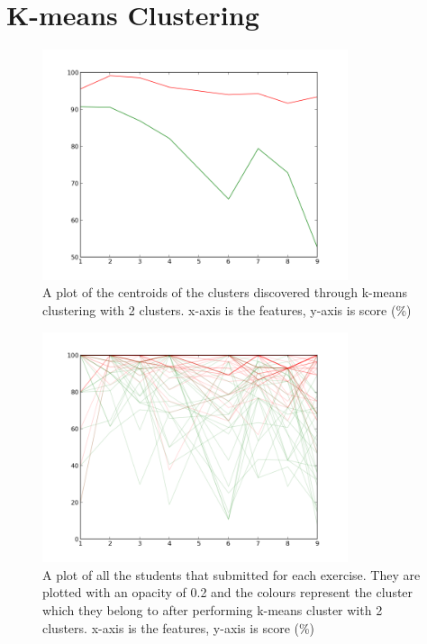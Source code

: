 \section{K-means Clustering}

\begin{figure}[h!]
\centering
\includegraphics[width=0.8\textwidth]{images/kmeans_2_centers.png}
\caption{A plot of the centroids of the clusters discovered through k-means clustering with 2 clusters. x-axis is the features, y-axis is score (\%)}
\label{fig:kmeans_2_centers}
\end{figure}

\begin{figure}[h!]
\centering
\includegraphics[width=0.8\textwidth]{images/kmeans_2.png}
\caption{A plot of all the students that submitted for each exercise. They are plotted with an opacity of 0.2 and the colours represent the cluster which they belong to after performing k-means cluster with 2 clusters. x-axis is the features, y-axis is score (\%)}
\label{fig:kmeans_2}
\end{figure}

